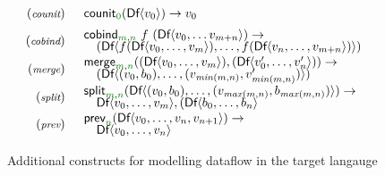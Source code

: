 \begin{figure}[t]
\begin{equation*}
\begin{array}{rl}
{\footnotesize(\emph{counit})} & \begin{array}{l}
\ident{counit}_{\cclrd{0}}(\ident{Df} \langle v_0 \rangle)   \rightarrow v_0
\end{array}
\\[0.5em]
{\footnotesize(\emph{cobind})} & \begin{array}{l}
\ident{cobind}_{\cclrd{m}, \cclrd{n}}~f~(\ident{Df}\langle v_0, \ldots v_{m+n} \rangle) \rightarrow
\\[-0.25em]
\quad (\ident{Df}\langle f (\ident{Df}\langle v_0, \ldots, v_m \rangle), \ldots, f (\ident{Df}\langle v_{n}, \ldots, v_{m+n} \rangle) \rangle)
\end{array}
\\[0.5em]
{\footnotesize(\emph{merge})} & \begin{array}{l}
\ident{merge}_{\cclrd{m}, \cclrd{n}} ((\ident{Df}\langle v_0, \ldots, v_m \rangle), (\ident{Df}\langle v'_0, \ldots, v'_n\rangle)) \rightarrow
\\[-0.25em]
\quad (\ident{Df}\langle (v_0, b_0), \ldots, (v_{\mathit{min}(m,n)}, v'_{\mathit{min}(m,n)}) \rangle)
\end{array}
\\[0.5em]
{\footnotesize(\emph{split})} & \begin{array}{l}
\ident{split}_{\cclrd{m}, \cclrd{n}} (\ident{Df}\langle (v_0, b_0), \ldots, (v_{\mathit{max}(m,n)}, b_{\mathit{max}(m,n)}) \rangle)  \rightarrow
\\[-0.25em]
\quad \ident{Df}\langle v_0, \ldots, v_m \rangle, (\ident{Df}\langle b_0, \ldots, b_n\rangle
\end{array}
\\[0.5em]
{\footnotesize(\emph{prev})} & \begin{array}{l}
\ident{prev}_{\cclrd{n}} (\ident{Df}\langle v_0, \ldots, v_n, v_{n+1} \rangle) \rightarrow
\\[-0.25em]
\quad \ident{Df}\langle v_0, \ldots, v_n \rangle
\end{array}
\end{array}
\end{equation*}

\caption{Additional constructs for modelling dataflow in the target langauge}
\label{fig:semantics-ext-df}
\end{figure}


